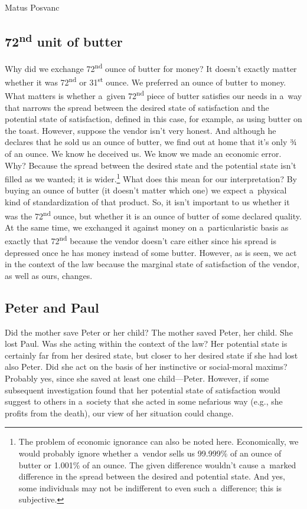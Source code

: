 \begin{artengenv}{Matus Posvanc}
\subsection*{72\textsuperscript{nd} unit of butter}



Why did we exchange 72\textsuperscript{nd} ounce of butter for money? It doesn't exactly matter whether it was 72\textsuperscript{nd} or 31\textsuperscript{st} ounce. We preferred an ounce of butter to money. What matters is whether a~given 72\textsuperscript{nd} piece of butter satisfies our needs in a~way that narrows the spread between the desired state of satisfaction and the potential state of satisfaction, defined in this case, for example, as using butter on the toast. However, suppose the vendor isn't very honest. And although he declares that he sold us an ounce of butter, we find out at home that it's only ¾ of an ounce. We know he deceived us. We know we made an economic error. Why? Because the spread between the desired state and the potential state isn't filled as we wanted; it is wider.\footnote{The problem of economic ignorance can also be noted here. Economically, we would probably ignore whether a~vendor sells us 99.999\% of an ounce of butter or 1.001\% of an ounce. The given difference wouldn't cause a~marked difference in the spread between the desired and potential state. And yes, some individuals may not be indifferent to even such a~difference; this is subjective.} What does this mean for our interpretation? By buying an ounce of butter (it doesn't matter which one) we expect a~physical kind of standardization of that product. So, it isn't important to us whether it was the 72\textsuperscript{nd} ounce, but whether it is an ounce of butter of some declared quality. At the same time, we exchanged it against money on a~particularistic basis as exactly that 72\textsuperscript{nd} because the vendor doesn't care either since his spread is depressed once he has money instead of some butter. However, as is seen, we act in the context of the law because the marginal state of satisfaction of the vendor, as well as ours, changes.



\subsection*{Peter and Paul }



Did the mother save Peter or her child? The mother saved Peter, her child. She lost Paul. Was she acting within the context of the law? Her potential state is certainly far from her desired state, but closer to her desired state if she had lost also Peter. Did she act on the basis of her instinctive or social-moral maxims? Probably yes, since she saved at least one child---Peter. However, if some subsequent investigation found that her potential state of satisfaction would suggest to others in a~society that she acted in some nefarious way (e.g., she profits from the death), our view of her situation could change.




\end{artengenv}
